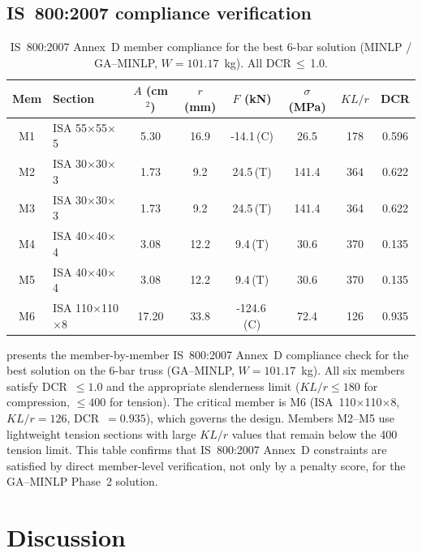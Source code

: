 \documentclass[lineno,pdflatex,sn-mathphys-num]{sn-jnl}
\begin{document}
\subsection{IS~800:2007 compliance verification}


\begin{table}[tbp]\centering\small
\caption{IS~800:2007 Annex~D member compliance for the best 6-bar solution (MINLP / GA--MINLP, $W=101.17$~kg). All DCR\,$\leq$\,1.0.}
\label{tab:is800_6bar}
\setlength{\tabcolsep}{4pt}
\begin{tabular}{@{}clcccccc@{}}
\toprule
Mem & Section & $A$ (cm$^2$) & $r$ (mm) & $F$ (kN) & $\sigma$ (MPa) & $KL/r$ & DCR \\
\midrule
M1 & ISA 55$\times$55$\times$5 & 5.30 & 16.9 & -14.1\,(C) & 26.5 & 178 & 0.596 \\
M2 & ISA 30$\times$30$\times$3 & 1.73 & 9.2 & 24.5\,(T) & 141.4 & 364 & 0.622 \\
M3 & ISA 30$\times$30$\times$3 & 1.73 & 9.2 & 24.5\,(T) & 141.4 & 364 & 0.622 \\
M4 & ISA 40$\times$40$\times$4 & 3.08 & 12.2 & 9.4\,(T) & 30.6 & 370 & 0.135 \\
M5 & ISA 40$\times$40$\times$4 & 3.08 & 12.2 & 9.4\,(T) & 30.6 & 370 & 0.135 \\
M6 & ISA 110$\times$110$\times$8 & 17.20 & 33.8 & -124.6\,(C) & 72.4 & 126 & 0.935 \\
\bottomrule
\end{tabular}
\end{table}



 presents the member-by-member IS~800:2007
Annex~D compliance check for the best solution on the 6-bar truss
(GA--MINLP, $W=101.17$~kg).
All six members satisfy DCR~$\leq 1.0$ and the appropriate
slenderness limit ($KL/r \leq 180$ for compression, $\leq 400$ for
tension). The critical member is M6 (ISA~110$\times$110$\times$8,
$KL/r=126$, DCR~$=0.935$), which governs the design. Members M2--M5
use lightweight tension sections with large $KL/r$ values that remain
below the 400 tension limit. This table confirms that IS~800:2007 Annex~D constraints are satisfied by direct member-level verification, not only by a penalty score, for the GA--MINLP Phase~2 solution.


\section{Discussion}
\label{sec:discussion}
\end{document}
